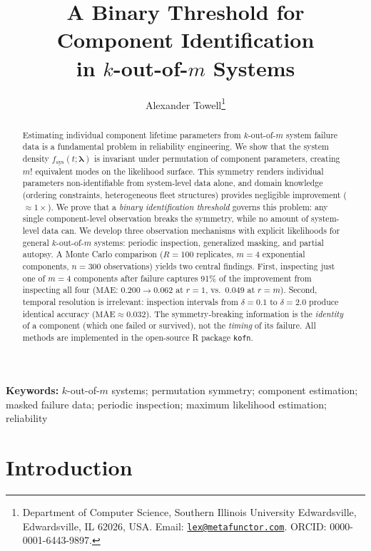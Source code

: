 \documentclass[12pt]{article}
\title{A Binary Threshold for Component Identification\\
  in $k$-out-of-$m$ Systems}
\author{
  Alexander Towell\thanks{
    Department of Computer Science,
    Southern Illinois University Edwardsville, Edwardsville, IL 62026, USA.
    Email: \href{mailto:lex@metafunctor.com}{\texttt{lex@metafunctor.com}}.
    ORCID: 0000-0001-6443-9897.}
}
\date{}
\newcommand{\fsys}{f_{\mathrm{sys}}}
\newcommand{\MAE}{\mathrm{MAE}}
\newcommand{\blambda}{\boldsymbol{\lambda}}
\begin{document}
\maketitle


\begin{abstract}
Estimating individual component lifetime parameters from $k$-out-of-$m$ system
failure data is a fundamental problem in reliability engineering.  We show that
the system density $\fsys(t; \blambda)$ is invariant under permutation of
component parameters, creating $m!$ equivalent modes on the likelihood surface.
This symmetry renders individual parameters non-identifiable from system-level
data alone, and domain knowledge (ordering constraints, heterogeneous fleet
structures) provides negligible improvement (${\approx}1\times$).
We prove that a \emph{binary identification threshold} governs this problem:
any single component-level observation breaks the symmetry, while no amount of
system-level data can.  We develop three observation mechanisms with explicit
likelihoods for general $k$-out-of-$m$ systems: periodic inspection,
generalized masking, and partial autopsy.  A Monte Carlo comparison
($R = 100$ replicates, $m = 4$ exponential components, $n = 300$ observations)
yields two central findings.  First, inspecting just one of $m = 4$ components
after failure captures 91\% of the improvement from inspecting all four
($\MAE$: $0.200 \to 0.062$ at $r = 1$, vs.\ $0.049$ at $r = m$).
Second, temporal resolution is irrelevant: inspection intervals from
$\delta = 0.1$ to $\delta = 2.0$ produce identical accuracy
($\MAE \approx 0.032$).  The symmetry-breaking information is the
\emph{identity} of a component (which one failed or survived), not the
\emph{timing} of its failure.  All methods are implemented in the open-source
R package \texttt{kofn}.
\end{abstract}

\medskip
\noindent
\textbf{Keywords:}
$k$-out-of-$m$ systems; permutation symmetry; component estimation;
masked failure data; periodic inspection; maximum likelihood estimation;
reliability


\section{Introduction}\label{sec:intro}
\end{document}

